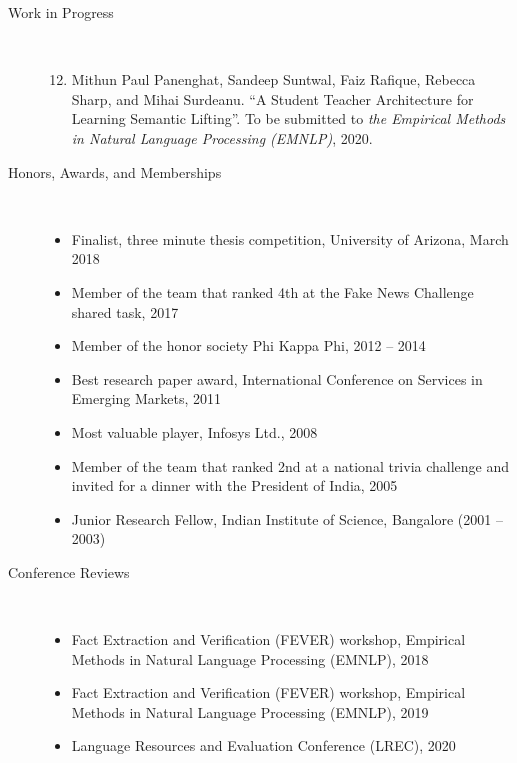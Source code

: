 \documentclass[10pt]{article}
\newcommand{\ve}[1]{{\em #1}} %
\newcommand{\ti}[1]{``#1''} %
\begin{document}
\begin{description}
\begin{enumerate}
\end{enumerate}


\item [Work in Progress] \
\begin{enumerate}
\setcounter{enumi}{11}



\item Mithun Paul Panenghat, Sandeep Suntwal, Faiz Rafique, Rebecca Sharp, and Mihai Surdeanu.   \ti{A Student Teacher Architecture for Learning Semantic Lifting}. To be submitted to \ve {the Empirical Methods in Natural Language Processing (EMNLP)}, 2020.

\end{enumerate}



\bigskip

\vspace{-.3cm}
\item [Honors, Awards, and Memberships]\
\begin{itemize}
\itemsep-1em 
\item Finalist, three minute thesis competition, University of Arizona, March 2018\\

\item Member of the team that ranked 4th at the Fake News Challenge shared task, 2017\\
\item Member of the honor society Phi Kappa Phi, 2012 -- 2014\\
\item Best research paper award, International Conference on Services in Emerging Markets, 2011\\
\item Most valuable player,  Infosys  Ltd., 2008\\
\item Member of the team that ranked 2nd at a national trivia challenge and invited for a dinner with the President of India, 2005\\
\item Junior Research Fellow, Indian Institute of Science, Bangalore (2001 – 2003)\\

\end{itemize}


\vspace{-.4cm}\item [Conference Reviews]\ 
\begin{itemize}
\itemsep-1em 
\item Fact Extraction and Verification (FEVER) workshop, Empirical Methods in Natural Language Processing (EMNLP), 2018\\
\item Fact Extraction and Verification (FEVER) workshop, Empirical Methods in Natural Language Processing (EMNLP), 2019\\
\item Language Resources and Evaluation Conference (LREC), 2020\\


\end{itemize}
\end{description}
\end{document}
